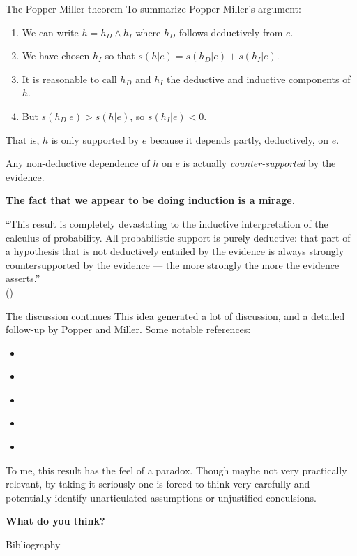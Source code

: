 \documentclass[8pt]{beamer}\usepackage[]{graphicx}\usepackage[]{color}
\begin{document}
\begin{frame}{The Popper-Miller theorem}
%
To summarize Popper-Miller's argument:
%
\begin{enumerate}
%
\item We can write $h = h_D \land h_I$ where $h_D$ follows deductively from $e$.
\item We have chosen $h_I$ so that $s(h | e) = s(h_D | e) + s(h_I | e)$.
\item It is reasonable to call $h_D$ and $h_I$ the deductive and
inductive components of $h$.
\item But $s(h_D | e) > s(h | e)$, so $s(h_I | e) < 0$.
%
\end{enumerate}
%
That is, $h$ is only supported by $e$ because
it depends partly, deductively, on $e$.

Any non-deductive dependence of $h$ on $e$ is actually
{\em counter-supported} by the evidence.

\textbf{The fact that we appear to be doing induction is a mirage.}

\pause

\begin{addmargin}[2em]{2em}%
``This result is completely
devastating to the inductive interpretation of the calculus of probability. All
probabilistic support is purely deductive: that part of a hypothesis that is not
deductively entailed by the evidence is always strongly countersupported by
the evidence --- the more strongly the more the evidence asserts.''\\
(\cite{popper:1983:impossibilityinductiveprobability})
\end{addmargin}

\end{frame}

\begin{frame}{The discussion continues}
%
This idea generated a lot of discussion, and a detailed
follow-up by Popper and Miller.  Some notable references:
%
\begin{itemize}
%
\item \cite{levi:1984:impossibility}
\item \cite{redhead:1985:impossibility}
\item \cite{levi:1986:probabilisticpettifoggery}
\item \cite{good:1990:suspiciouspoppermiller}
\item \cite{popper:1987:probabilistic}
%
\end{itemize}
%
To me, this result has the feel of a paradox.  Though maybe not very practically
relevant, by taking it seriously one is forced to think very carefully and
potentially identify unarticulated assumptions or unjustified conculsions.

\textbf{What do you think?}

\end{frame}


\begin{frame}{Bibliography}
\printbibliography{}
\end{frame}
\end{document}
